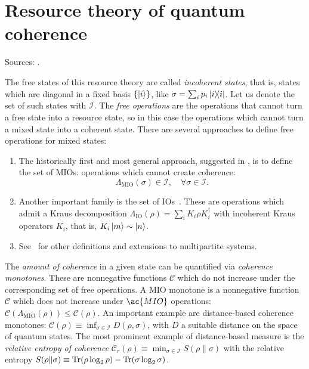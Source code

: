 \documentclass[12pt]{report}
\newcommand{\on}[1]{\operatorname{#1}}
\begin{document}
\section{Resource theory of quantum coherence}
\newcommand{\setIncoherentStates}{\mathcal{I}}
Sources: \cite{aberg2006quantifying,baumgratz2014quantifying,winter2016operational,marvian2016how,streltsov2016quantum}.

The free states of this resource theory are called \emph{incoherent states},
that is, states which are diagonal in a fixed basis $\{\ket i\}$, like $\sigma = \sum_i p_i \ketbra{i}$.
Let us denote the set of such states with $\setIncoherentStates{}$.
The \emph{free operations} are the operations that cannot turn a free state into a resource state, so in this case the operations which cannot turn a mixed state into a coherent state.
There are several approaches to define free operations for mixed states:
\begin{enumerate}
	\item The historically first and most general approach, suggested in \cite{aberg2006quantifying}, is to define the set of \acp{MIO}: operations which cannot create coherence:
	\begin{equation}
	 	\Lambda_{\on{MIO}}(\sigma) \in \setIncoherentStates{}, \quad \forall \sigma \in \setIncoherentStates{}.
	 \end{equation}
	 \item Another important family is the set of \acp{IO}~\cite{baumgratz2014quantifying}.
	 These are operations which admit a Kraus decomposition $\Lambda_{\on{IO}}(\rho) = \sum_i K_i \rho K_i^\dagger$ with incoherent Kraus operators $K_i$, that is, $K_i \ket m \sim \ket n$.
	 \item See~\cite{streltsov2016maximal} for other definitions and extensions to multipartite systems.
\end{enumerate}
The \emph{amount of coherence} in a given state can be quantified via \emph{coherence monotones}.
These are nonnegative functions $\mathcal C$ which do not increase under the corresponding set of free operations.
A \ac{MIO} monotone is a nonnegative function $\mathcal C$ which does not increase under $\ac{MIO}$ operations:
$\mathcal C(\Lambda_{\on{MIO}}(\rho)) \le \mathcal C(\rho)$.
An important example are distance-based coherence monotones:
$\mathcal C(\rho) \equiv \inf_{\sigma\in\setIncoherentStates{}} D(\rho,\sigma)$,
with $D$ a suitable distance on the space of quantum states.
The most prominent example of distance-based measure is the \emph{relative entropy of coherence}
$\mathcal C_r(\rho) \equiv \min_{\sigma\in\setIncoherentStates{}} S(\rho \| \sigma)$
with the relative entropy
$S(\rho \| \sigma) \equiv \Tr(\rho \log_2\rho) - \Tr(\sigma\log_2\sigma)$.
\end{document}

